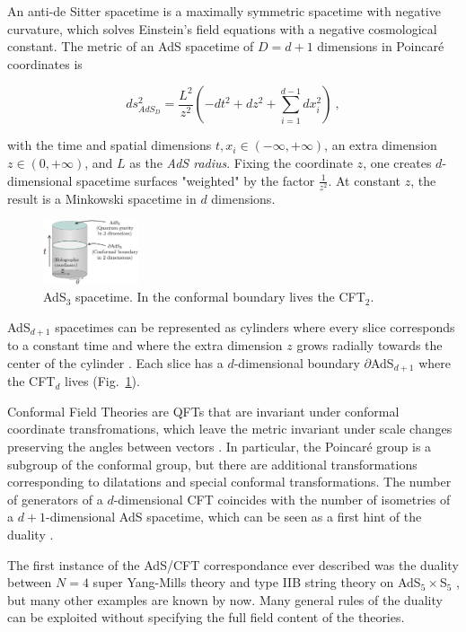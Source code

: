 \documentclass[twocolumn]{revtex4}
\providecommand{\eq}[2]{
    \begin{equation}
        #2
    \label{eq:#1}
    \end{equation}
}
\begin{document}
An anti-de Sitter spacetime is a maximally symmetric spacetime with negative curvature, which solves Einstein's field equations with a negative cosmological constant. The metric of an AdS spacetime of $D=d+1$ dimensions in Poincaré coordinates is \cite{kaplan_lectures_nodate}
\eq{AdS_PP-metric}{
    ds_{AdS_D}^2 = \frac{L^2}{z^2} \left( -dt^2 + dz^2 + \sum_{i=1}^{d-1} dx_i^2 \right) \ ,
}
with the time and spatial dimensions $t , x_i \in (-\infty,+\infty)$, an extra dimension $z \in (0,+\infty)$, and $L$ as the \textit{AdS radius}. Fixing the coordinate $z$, one creates $d$-dimensional spacetime surfaces "weighted" by the factor $\frac{1}{z^2}$. At constant $z$, the result is a Minkowski spacetime in $d$ dimensions.

\begin{figure}
    \centering
    \includegraphics[width=0.25\textwidth]{../Imatges/AdS_Cylindric.png}
\caption{AdS$_3$ spacetime. In the conformal boundary lives the CFT$_2$.}
\label{fig:AdS}
\end{figure}

AdS$_{d+1}$ spacetimes can be represented as cylinders where every slice corresponds to a constant time and where the extra dimension $z$ grows radially towards the center of the cylinder \cite{}. Each slice has a $d$-dimensional boundary $\partial$AdS$_{d+1}$ where the CFT$_d$ lives (Fig.~\ref{fig:AdS}).

Conformal Field Theories are QFTs that are invariant under conformal coordinate transfromations, which leave the metric invariant under scale changes preserving the angles between vectors \cite{ginsparg_applied_1988}. In particular, the Poincaré group is a subgroup of the conformal group, but there are additional transformations corresponding to dilatations and special conformal transformations. The number of generators of a $d$-dimensional CFT coincides with the number of isometries of a $d+1$-dimensional AdS spacetime, which can be seen as a first hint of the duality \cite{}.

The first instance of the AdS/CFT correspondance ever described was the duality between $N=4$ super Yang-Mills theory and type IIB string theory on AdS$_5 \times $S$_5$ \cite{maldacena_large_1999}, but many other examples are known by now. Many general rules of the duality can be exploited without specifying the full field content of the theories.
\end{document}
